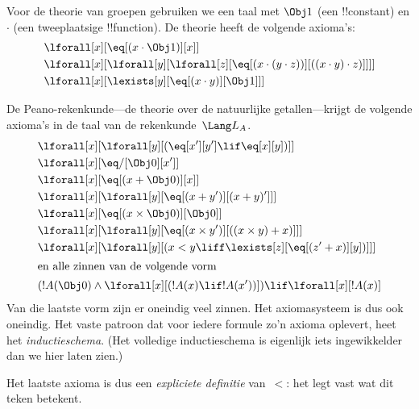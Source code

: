 \documentclass[openany]{memoir}
\begin{document}
\begin{ex}
Voor de theorie van groepen gebruiken we een taal met $\Obj 1$ (een
!!{constant}) en $\cdot$ (een tweeplaatsige !!{function}). De theorie
heeft de volgende axioma's:
\begin{align*}
& \lforall[x][\eq[(x \cdot \Obj 1)][x]]\\
& \lforall[x][\lforall[y][\lforall[z][\eq[(x \cdot (y \cdot z))][((x
          \cdot y) \cdot z)]]]]\\
& \lforall[x][\lexists[y][\eq[(x \cdot y)][\Obj 1]]]
\end{align*}
\end{ex}

\begin{ex}
De Peano-rekenkunde---de theorie over de natuurlijke getallen---krijgt
de volgende axioma's in de taal van de rekenkunde~$\Lang L_A$.
\begin{align*}
& \lforall[x][\lforall[y][(\eq[x'][y'] \lif \eq[x][y])]]\\
& \lforall[x][\eq/[\Obj 0][x']]\\
& \lforall[x][\eq[(x + \Obj 0)][x]]\\
& \lforall[x][\lforall[y][\eq[(x + y')][(x + y)']]]\\
& \lforall[x][\eq[(x \times \Obj 0)][\Obj 0]]\\
& \lforall[x][\lforall[y][\eq[(x \times y')][((x \times y) + x)]]]\\
& \lforall[x][\lforall[y][(x < y \liff \lexists[z][\eq[(z' + x)][y])]]]\\
\intertext{en alle zinnen van de volgende vorm}
& (!A(\Obj 0) \land \lforall[x][(!A(x) \lif !A(x'))]) \lif \lforall[x][!A(x)]
\end{align*}
Van die laatste vorm zijn er oneindig veel zinnen. Het axiomasysteem
is dus ook oneindig. Het vaste patroon dat voor iedere formule zo'n
axioma oplevert, heet het \emph{inductieschema}. (Het volledige
inductieschema is eigenlijk iets ingewikkelder dan we hier laten
zien.)

Het laatste axioma is dus een \emph{expliciete definitie} van~$<$: het
legt vast wat dit teken betekent.
\end{ex}
\end{document}
